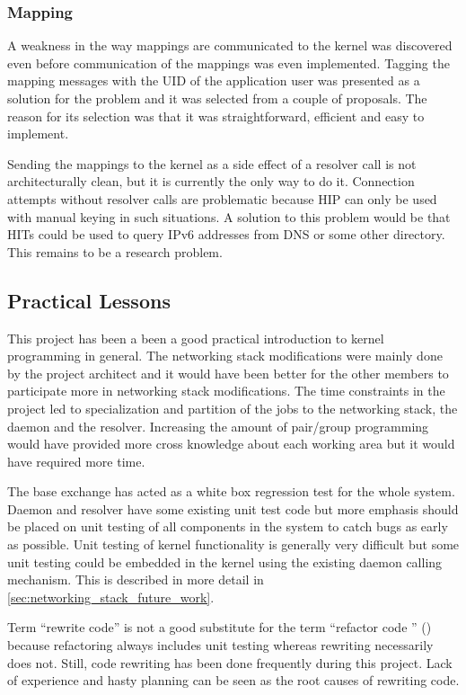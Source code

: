 \subsubsection{Mapping}
\label{sec:mapping_lessons}

A weakness in the way mappings are communicated to the kernel was
discovered even before communication of the mappings was even
implemented. Tagging the mapping messages with the UID of the
application user was presented as a solution for the problem and it
was selected from a couple of proposals. The reason for its selection
was that it was straightforward, efficient and easy to implement.

Sending the mappings to the kernel as a side effect of a resolver call
is not architecturally clean, but it is currently the only way to do
it. Connection attempts without resolver calls are problematic because
HIP can only be used with manual keying in such situations. A solution
to this problem would be that HITs could be used to query IPv6
addresses from DNS or some other directory. This remains to be a
research problem.

\subsection{Practical Lessons}
\label{sec:practical_lessons}

This project has been a been a good practical introduction to kernel
programming in general. The networking stack modifications were mainly
done by the project architect and it would have been better for the
other members to participate more in networking stack
modifications. The time constraints in the project led to
specialization and partition of the jobs to the networking stack, the
daemon and the resolver. Increasing the amount of pair/group
programming would have provided more cross knowledge about each
working area but it would have required more time.

The base exchange has acted as a white box regression test for the
whole system. Daemon and resolver have some existing unit test code
but more emphasis should be placed on unit testing of all components
in the system to catch bugs as early as possible. Unit testing of
kernel functionality is generally very difficult but some unit testing
could be embedded in the kernel using the existing daemon calling
mechanism. This is described in more detail in
\autoref{sec:networking_stack_future_work}.

Term ``rewrite code'' is not a good substitute for the term ``refactor
code '' (\cite{refactoring}) because refactoring always includes unit
testing whereas rewriting necessarily does not. Still, code rewriting
has been done frequently during this project. Lack of experience and
hasty planning can be seen as the root causes of rewriting code.

